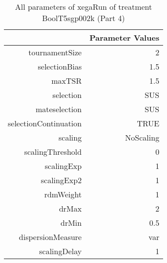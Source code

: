 \begin{table}[ht]
\centering
\begin{tabular}{rr}
  \hline
 & Parameter Values \\ 
  \hline
tournamentSize & 2 \\ 
  selectionBias & 1.5 \\ 
  maxTSR & 1.5 \\ 
  selection & SUS \\ 
  mateselection & SUS \\ 
  selectionContinuation & TRUE \\ 
  scaling & NoScaling \\ 
  scalingThreshold & 0 \\ 
  scalingExp & 1 \\ 
  scalingExp2 & 1 \\ 
  rdmWeight & 1 \\ 
  drMax & 2 \\ 
  drMin & 0.5 \\ 
  dispersionMeasure & var \\ 
  scalingDelay & 1 \\ 
   \hline
\end{tabular}
\caption{ All parameters of xegaRun of treatment BoolT5sgp002k 
 (Part 4)} 
\end{table}
